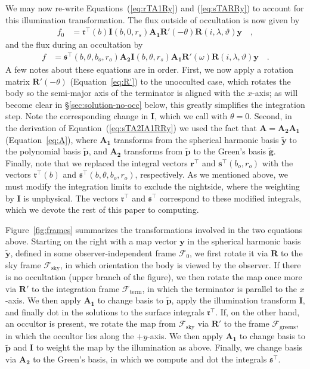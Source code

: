 \documentclass[modern]{aastex62}
\newcommand{\BF}[1]{\ensuremath{\mathbf{#1}}}
\newcommand{\sT}{\ensuremath{\mathfrak{s}^\top}}
\newcommand{\rT}{\ensuremath{\mathfrak{r}^\top}}
\newcommand{\sTe}{\ensuremath{\BF{s}^\top}}
\newcommand{\rTe}{\ensuremath{\BF{r}^\top}}
\newcommand{\bg}{\ensuremath{\tilde{\BF{g}}}}
\newcommand{\bp}{\ensuremath{\tilde{\BF{p}}}}
\newcommand{\by}{\ensuremath{\tilde{\BF{y}}}}
\begin{document}
We may now re-write Equations~(\ref{eq:rTA1Ry}) and (\ref{eq:sTARRy}) to
account for this illumination transformation. The flux outside of occultation
is now given by
%
\begin{align}
    \label{eq:rTIA1RRy}
    f_0 & =
    \mathfrak{r}^\top(b)
    \BF{I}(b, 0, r_s)
    \BF{A_1}
    \BF{R}'(-\theta)
    \BF{R}(i, \lambda, \vartheta)
    \BF{y}
    \quad,
\end{align}
%
and the flux during an occultation by
%
\begin{align}
    \label{eq:sTA2IA1RRy}
    f & =
    \mathfrak{s}^\top(b, \theta, b_o, r_o)
    \BF{A_2}
    \BF{I}(b, \theta, r_s)
    \BF{A_1}
    \BF{R}'(\omega)
    \BF{R}(i, \lambda, \vartheta)
    \BF{y}
    \quad.
\end{align}
%
A few notes about these equations are in order.
First, we now apply a rotation matrix $\BF{R}'(-\theta)$
(Equation~\ref{eq:R'}) to the unocculted case,
which rotates the body so the semi-major axis of the terminator is aligned
with the $x$-axis; as will become clear in \S\ref{sec:solution-no-occ} below,
this greatly simplifies the integration step. Note the corresponding change
in $\BF{I}$, which we call with $\theta = 0$.
%
Second, in the derivation of Equation~(\ref{eq:sTA2IA1RRy})
we used the fact that $\BF{A} = \BF{A_2} \BF{A_1}$
(Equation~\ref{eq:A}), where $\BF{A_1}$ transforms from
the spherical harmonic basis $\by$ to the polynomial basis $\bp$, and
$\BF{A_2}$ transforms from $\bp$ to the Green's basis $\bg$.
Finally, note that we replaced the integral vectors
$\rTe$ and $\sTe(b_o, r_o)$
with the vectors
$\mathfrak{r}^\top(b)$ and $\mathfrak{s}^\top(b, \theta, b_o, r_o)$,
respectively.
As we mentioned above, we must modify the integration limits to exclude the
nightside, where the weighting by $\BF{I}$ is unphysical.
The vectors $\mathfrak{r}^\top$ and $\mathfrak{s}^\top$ correspond to these
modified integrals, which we devote the rest of this paper to
computing.

Figure~\ref{fig:frames} summarizes the transformations involved in the two
equations above. Starting on the right with a map vector $\BF{y}$ in
the spherical harmonic basis $\by$, defined in some observer-independent frame
$\mathcal{F}_0$, we first rotate it via $\BF{R}$ to the sky frame
$\mathcal{F}_\mathrm{sky}$, in which orientation the body is viewed by the
observer. If there is no occultation (upper branch of the figure), we then
rotate the map once more via $\BF{R}'$ to the integration frame
$\mathcal{F}_\mathrm{term}$, in which the terminator is parallel to the
$x$-axis. We then apply $\BF{A_1}$ to change basis to $\bp$, apply the
illumination transform $\BF{I}$, and finally dot in the solutions to the
surface integrals $\rT$. If, on the other hand, an occultor is present,
we rotate the map from $\mathcal{F}_\mathrm{sky}$ via $\BF{R}'$ to the frame
$\mathcal{F}_\mathrm{greens}$, in which the occultor lies along the
$+y$-axis. We then apply $\BF{A_1}$ to change basis to $\bp$ and $\BF{I}$
to weight the map by the illumination as above. Finally, we change basis
via $\BF{A_2}$ to the Green's basis, in which we compute and dot the
integrals $\sT$.
\end{document}
